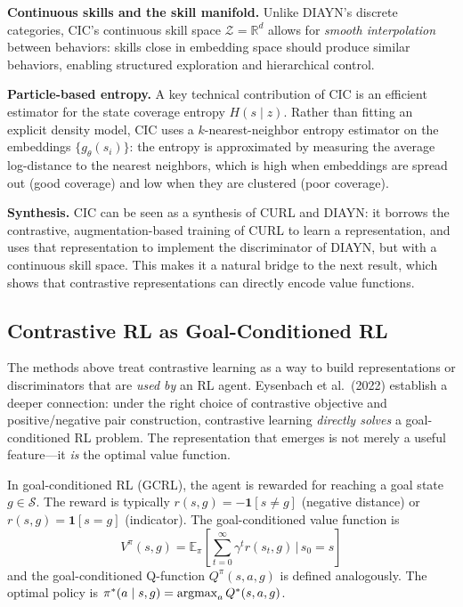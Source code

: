 \documentclass[11pt, letterpaper]{article}
\begin{document}
\begin{remark}
    \textbf{Continuous skills and the skill manifold.} Unlike DIAYN's discrete categories, CIC's continuous skill space \(\mathcal{Z} = \mathbb{R}^d\) allows for \textit{smooth interpolation} between behaviors: skills close in embedding space should produce similar behaviors, enabling structured exploration and hierarchical control.
 
    \textbf{Particle-based entropy.} A key technical contribution of CIC is an efficient estimator for the state coverage entropy \(H(s \mid z)\). Rather than fitting an explicit density model, CIC uses a \(k\)-nearest-neighbor entropy estimator on the embeddings \(\{g_\theta(s_i)\}\): the entropy is approximated by measuring the average log-distance to the nearest neighbors, which is high when embeddings are spread out (good coverage) and low when they are clustered (poor coverage).
 
    \textbf{Synthesis.} CIC can be seen as a synthesis of CURL and DIAYN: it borrows the contrastive, augmentation-based training of CURL to learn a representation, and uses that representation to implement the discriminator of DIAYN, but with a continuous skill space. This makes it a natural bridge to the next result, which shows that contrastive representations can directly encode value functions.
\end{remark}
 
\subsection{Contrastive RL as Goal-Conditioned RL}
 
The methods above treat contrastive learning as a way to build representations or discriminators that are \textit{used by} an RL agent. Eysenbach et al.\ (2022) establish a deeper connection: under the right choice of contrastive objective and positive/negative pair construction, contrastive learning \textit{directly solves} a goal-conditioned RL problem. The representation that emerges is not merely a useful feature---it \textit{is} the optimal value function.
 
\begin{concept}
    In goal-conditioned RL (GCRL), the agent is rewarded for reaching a goal state \(g \in \mathcal{S}\). The reward is typically \(r(s, g) = -\mathbf{1}[s \neq g]\) (negative distance) or \(r(s, g) = \mathbf{1}[s = g]\) (indicator). The goal-conditioned value function is
    \[
        V^\pi(s, g) = \mathbb{E}_\pi\left[\sum_{t=0}^\infty \gamma^t r(s_t, g) \,\biggr\rvert\, s_0 = s\right]
    \]
    and the goal-conditioned Q-function \(Q^\pi(s, a, g)\) is defined analogously. The optimal policy is \(\pi^*(a \mid s, g) = \operatorname*{argmax}_a Q^*(s, a, g)\).
\end{concept}
 
\end{document}
